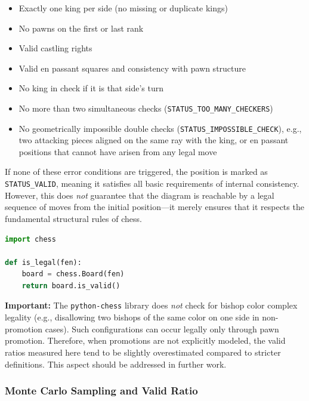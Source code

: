 \documentclass[12pt]{article}
\begin{document}
\begin{itemize}
    \item Exactly one king per side (no missing or duplicate kings)
    \item No pawns on the first or last rank
    \item Valid castling rights
    \item Valid en passant squares and consistency with pawn structure
    \item No king in check if it is that side’s turn
    \item No more than two simultaneous checks (\texttt{STATUS\_TOO\_MANY\_CHECKERS})
    \item No geometrically impossible double checks (\texttt{STATUS\_IMPOSSIBLE\_CHECK}), 
          e.g., two attacking pieces aligned on the same ray with the king,
          or en passant positions that cannot have arisen from any legal move
\end{itemize}

\noindent
If none of these error conditions are triggered, the position is marked as 
\texttt{STATUS\_VALID}, meaning it satisfies all basic requirements of internal consistency.
However, this does \emph{not} guarantee that the diagram is reachable by a legal sequence of moves from the initial position---it merely ensures that it respects the fundamental structural rules of chess.

\begin{lstlisting}[language=Python, caption={Validation of chess positions using python-chess}, label={lst:is_legal}]
import chess

def is_legal(fen):
    board = chess.Board(fen)
    return board.is_valid()
\end{lstlisting}

\noindent
\textbf{Important:} The \texttt{python-chess} library does \emph{not} check for bishop color complex legality 
(e.g., disallowing two bishops of the same color on one side in non-promotion cases). 
Such configurations can occur legally only through pawn promotion. 
Therefore, when promotions are not explicitly modeled, the valid ratios measured here 
tend to be slightly overestimated compared to stricter definitions. 
This aspect should be addressed in further work.

\subsubsection{Monte Carlo Sampling and Valid Ratio}
\end{document}
